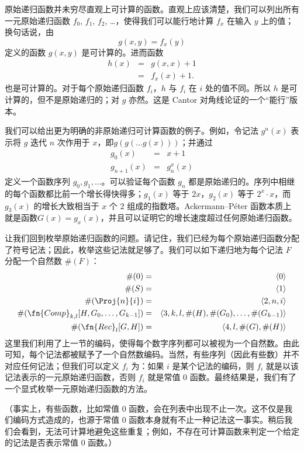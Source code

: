 \documentclass[../../../include/open-logic-section]{subfiles}
\begin{document}

原始递归函数并未穷尽直观上可计算的函数。直观上应该清楚，我们可以列出所有一元原始递归函数 $f_0$, $f_1$, $f_2$, \dots，使得我们可以能行地计算 $f_x$ 在输入 $y$ 上的值；换句话说，由
\[
g(x,y) = f_x(y)
\]
定义的函数 $g(x,y)$ 是可计算的。进而函数
\begin{eqnarray*}
h(x) & = & g(x,x) + 1 \\
& = & f_x(x) +1.
\end{eqnarray*}
也是可计算的。对于每个原始递归函数 $f_i$，$h$ 与 $f_i$ 在 $i$ 处的值不同。所以 $h$ 是可计算的，但不是原始递归的；对 $g$ 亦然。这是 Cantor 对角线论证的一个“能行”版本。

我们可以给出更为明确的非原始递归可计算函数的例子。例如，令记法 $g^n(x)$ 表示将 $g$ 迭代 $n$ 次作用于 $x$，即$g(g(\dots g(x)))$；并通过
\begin{eqnarray*}
g_0(x) & = & x+1 \\
g_{n + 1}(x) & = & g_n^x(x)
\end{eqnarray*}
定义一个函数序列 $g_0, g_1, \dots$。可以验证每个函数 $g_n$ 都是原始递归的。序列中相继的每个函数都比前一个增长得快得多；$g_1(x)$ 等于 $2x$，$g_2(x)$ 等于 $2^x \cdot x$，而 $g_3(x)$ 的增长大致相当于 $x$ 个 $2$ 组成的指数塔。Ackermann--P\'eter 函数本质上就是函数$G(x) = g_x(x)$，并且可以证明它的增长速度超过任何原始递归函数。

让我们回到枚举原始递归函数的问题。请记住，我们已经为每个原始递归函数分配了符号记法；因此，枚举这些记法就足够了。我们可以如下递归地为每个记法 $F$ 分配一个自然数 $\#(F)$：
\begin{eqnarray*}
\#(0) & = & \langle 0 \rangle \\
\#(S) & = & \langle 1 \rangle \\
\#(\Proj{n}{i}) & = & \langle 2, n, i \rangle \\
\#(\fn{Comp}_{k,l}[H,G_0,\dots,G_{k-1}]) & = & \langle
3,k,l,\#(H),\#(G_0),\dots,\#(G_{k-1}) \rangle \\
\#(\fn{Rec}_l[G,H]) & = & \langle 4, l, \#(G), \#(H) \rangle
\end{eqnarray*}
这里我们利用了上一节的编码，使得每个数字序列都可以被视为一个自然数。由此可知，每个记法都被赋予了一个自然数编码。当然，有些序列（因此有些数）并不对应任何记法；但我们可以定义 $f_i$ 为：如果 $i$ 是某个记法的编码，则 $f_i$ 就是以该记法表示的一元原始递归函数，否则 $f_i$ 就是常值 $0$ 函数。最终结果是，我们有了一个显式枚举一元原始递归函数的方法。

（事实上，有些函数，比如常值 $0$ 函数，会在列表中出现不止一次。这不仅是我们编码方式造成的，也源于常值 $0$ 函数本身就有不止一种记法这一事实。稍后我们会看到，无法可计算地避免这些重复；例如，不存在可计算函数来判定一个给定的记法是否表示常值 $0$ 函数。）
\end{document}
